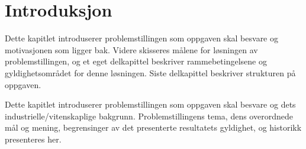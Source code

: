 
\chapter{Introduksjon}
Dette kapitlet introduserer problemstillingen som oppgaven skal besvare og motivasjonen som ligger bak. Videre skisseres målene for løsningen av problemstillingen, og et eget delkapittel beskriver rammebetingelsene og gyldighetsområdet for denne løsningen. Siste delkapittel beskriver strukturen på oppgaven.

Dette kapitlet introduserer problemstillingen som oppgaven skal besvare og dets industrielle/vitenskaplige bakgrunn. Problemstillingens tema, dens overordnede mål og mening, begrensinger av det presenterte resultatets gyldighet, og historikk presenteres her.







\cleardoublepage